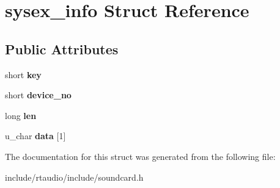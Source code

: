 \hypertarget{structsysex__info}{}\section{sysex\+\_\+info Struct Reference}
\label{structsysex__info}
\subsection*{Public Attributes}
\begin{DoxyCompactItemize}
\item 
short {\bfseries key}\hypertarget{structsysex__info_a66d5c6938e593539e34f6067b13757ad}{}\label{structsysex__info_a66d5c6938e593539e34f6067b13757ad}

\item 
short {\bfseries device\+\_\+no}\hypertarget{structsysex__info_ad1fcc0be2ae56feb0e1342ec8bcc17c6}{}\label{structsysex__info_ad1fcc0be2ae56feb0e1342ec8bcc17c6}

\item 
long {\bfseries len}\hypertarget{structsysex__info_a1cfb5ab86d36bbcafc4c6fa274c56f87}{}\label{structsysex__info_a1cfb5ab86d36bbcafc4c6fa274c56f87}

\item 
u\+\_\+char {\bfseries data} \mbox{[}1\mbox{]}\hypertarget{structsysex__info_a0d7b195d06c48e3b3dd299b0f53680de}{}\label{structsysex__info_a0d7b195d06c48e3b3dd299b0f53680de}

\end{DoxyCompactItemize}


The documentation for this struct was generated from the following file\+:\begin{DoxyCompactItemize}
\item 
include/rtaudio/include/soundcard.\+h\end{DoxyCompactItemize}
